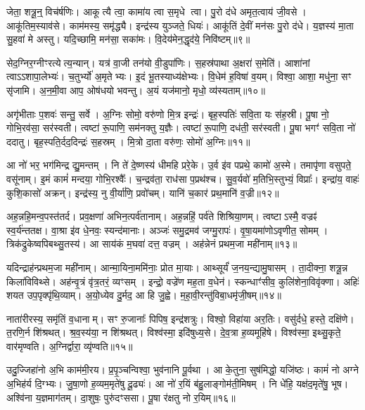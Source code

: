 जेता॒ शत्रू॒न्॒ विच॑र्\mbox{}षणिः।
आकूत्यै त्वा॒ कामा॑य त्वा स॒मृधे त्वा।
पु॒रो द॑धे अमृत॒त्वाय॑ जी॒वसे।
आकू॑तिम॒स्याव॑से।
काम॑मस्य॒ समृ॑द्ध्यै।
इन्द्र॑स्य युञ्जते॒ धियः॑।
आकू॑तिं दे॒वीं मन॑सः पु॒रो द॑धे।
य॒ज्ञस्य॑ मा॒ता सु॒हवा॑ मे अस्तु।
यदि॒च्छामि॒ मन॑सा॒ सका॑मः।
वि॒देय॑मेन॒द्धृद॑ये॒ निवि॑ष्टम्॥९॥

सेद॒ग्निर॒ग्नीꣳरत्येत्य॒न्यान्।
यत्र॑ वा॒जी तन॑यो वी॒डुपा॑णिः।
स॒हस्र॑पाथा अ॒क्षरा॑ स॒मेति॑।
आशा॑नां त्वा\-ऽऽशापा॒लेभ्यः॑।
च॒तुर्भ्यो॑ अ॒मृतेभ्यः।
इ॒दं भू॒तस्याध्य॑क्षेभ्यः।
वि॒धेम॑ ह॒विषा॑ व॒यम्।
विश्वा॒ आशा॒ मधु॑ना॒ सꣳ सृ॑जामि।
अ॒न॒मी॒वा आप॒ ओष॑धयो भवन्तु।
अ॒यं यज॑मानो॒ मृधो॒ व्य॑स्यताम्॥१०॥

अगृ॑भीताः प॒शवः॑ सन्तु॒ सर्वे।
अ॒ग्निः सोमो॒ वरु॑णो मि॒त्र इन्द्रः॑।
बृह॒स्पतिः॑ सवि॒ता यः स॑ह॒स्री।
पू॒षा नो॒ गोभि॒रव॑सा॒ सर॑स्वती।
त्वष्टा॑ रू॒पाणि॒ सम॑नक्तु य॒ज्ञैः।
त्वष्टा॑ रू॒पाणि॒ दध॑ती॒ सर॑स्वती।
पू॒षा भगꣳ॑ सवि॒ता नो॑ ददातु।
बृह॒स्पति॒र्दद॒दिन्द्रः॑ स॒हस्रम्।
मि॒त्रो दा॒ता वरु॑णः॒ सोमो॑ अ॒ग्निः॥११॥\anuvakamend[क॒र॒न्निवि॑ष्टमस्यता॒न्नव॑ च]

आ नो॑ भर॒ भग॑मिन्द्र द्यु॒मन्तम्।
नि ते॑ दे॒ष्णस्य॑ धीमहि प्ररे॒के।
उ॒र्व इ॑व पप्रथे॒ कामो॑ अ॒स्मे।
तमापृ॑णा वसुपते॒ वसू॑नाम्।
इ॒मं कामं॑ मन्दया॒ गोभि॒रश्वैः᳚।
च॒न्द्रव॑ता॒ राध॑सा प॒प्रथ॑श्च।
सु॒व॒र्यवो॑ म॒तिभि॒स्तुभ्यं॒ विप्राः᳚।
इन्द्रा॑य॒ वाहः॑ कुशि॒कासो॑ अक्रन्।
इन्द्र॑स्य॒ नु वी॒र्या॑णि॒ प्रवो॑चम्।
यानि॑ च॒कार॑ प्रथ॒मानि॑ व॒ज्री॥१२॥

अह॒न्नहि॒मन्व॒पस्त॑तर्द।
प्रव॒क्षणा॑ अभिन॒त्पर्व॑तानाम्।
अह॒न्नहिं॒ पर्व॑ते शिश्रिया॒णम्।
त्वष्टा\-ऽस्मै॒ वज्रꣴ॑ स्व॒र्य॑न्ततक्ष।
वा॒श्रा इ॑व धे॒नवः॒ स्यन्द॑मानाः।
अञ्जः॑ समु॒द्रमव॑ जग्मु॒रापः॑।
वृ॒षा॒यमा॑णो\-ऽवृणीत॒ सोमम्।
त्रिक॑द्रुकेष्वपिबथ्सु॒तस्य॑।
आ साय॑कं म॒घवा॑ दत्त॒ वज्रम्।
अह॑न्नेनं प्रथम॒जा मही॑नाम्॥१३॥

यदिन्द्राह॑न्प्रथम॒जा मही॑नाम्।
आन्मा॒यिना॒ममि॑नाः॒ प्रोत मा॒याः।
आथ्सूर्यं॑ ज॒नय॒न्द्यामु॒षासम्।
ता॒दीक्ना॒ शत्रू॒न्न किला॑विविथ्से।
अह॑न्वृ॒त्रं वृ॑त्र॒तरं॒ व्यꣳसम्।
इन्द्रो॒ वज्रे॑ण मह॒ता व॒धेन॑।
स्कन्धाꣳ॑सीव॒ कुलि॑शेना॒विवृ॑क्णा।
अहिः॑ शयत उप॒पृक्पृ॑थि॒व्याम्।
अ॒यो॒ध्येव दु॒र्मद॒ आ हि जु॒ह्वे।
म॒हा॒वी॒रन्तु॑विबा॒धमृ॑जी॒षम्॥१४॥

नाता॑रीरस्य॒ समृ॑तिं व॒धानाम्।
सꣳ रु॒जानाः᳚ पिपिष॒ इन्द्र॑शत्रुः।
विश्वो॒ विहा॑या अर॒तिः।
वसु॑र्दधे॒ हस्ते॒ दक्षि॑णे।
त॒रणि॒र्न शि॑श्रथत्।
श्र॒व॒स्य॑या॒ न शि॑श्रथत्।
विश्व॑स्मा॒ इदि॑षुध्य॒से।
दे॒व॒त्रा ह॒व्यमूहि॑षे।
विश्व॑स्मा॒ इथ्सु॒कृते॒ वार॑मृण्वति।
अ॒ग्निर्द्वारा॒ व्यृ॑ण्वति॥१५॥

उदु॒ज्जिहा॑नो अ॒भि काम॑मी॒रय\sn{}।
प्र॒पृ॒ञ्चन्विश्वा॒ भुव॑नानि पू॒र्वथा।
आ के॒तुना॒ सुष॑मिद्धो॒ यजि॑ष्ठः।
कामं॑ नो अग्ने अ॒भिह॑र्य दि॒ग्भ्यः।
जु॒षा॒णो ह॒व्यम॒मृते॑षु दू॒ढ्यः॑।
आ नो॑ र॒यिं ब॑हु॒लाङ्गोम॑ती॒मिषम्।
नि धे॑हि॒ यक्ष॑द॒मृते॑षु॒ भूष\sn{}।
अश्वि॑ना य॒ज्ञमाग॑तम्।
दा॒शुषः॒ पुरु॑दꣳससा।
पू॒षा र॑क्षतु नो र॒यिम्॥१६॥

